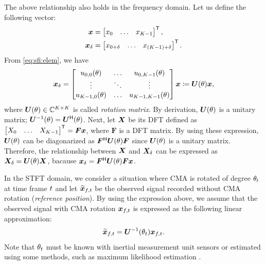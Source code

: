 \documentclass[sip,biber]{now-journal}
\begin{document}
The above relationship also holds in the frequency domain.
Let us define the following vector:
\begin{align}
  \bm{x} &= \begin{bmatrix} x _{0} & \dots & x _{K - 1} \end{bmatrix} ^{\mathsf{T}}, \\
  \bm{x} _{\delta} &= \begin{bmatrix} x _{0+\delta} & \dots & x _{(K - 1)+\delta} \end{bmatrix} ^{\mathsf{T}}.
\end{align}
From \eqref{eq:sfi:elem}, we have
\begin{equation}
  \bm{x} _{\delta}
  =
  \begin{bmatrix}
    u _{0, 0}(\theta) & \dots & u _{0, K - 1}(\theta) \\
    \vdots & \ddots & \vdots \\
    u _{K - 1, 0}(\theta) & \dots & u _{K - 1, K - 1}(\theta)
  \end{bmatrix}
  \bm{x}
  \coloneqq
  \bm{U} (\theta) \bm{x},
  \label{eq:rotmat}
\end{equation}
where $\bm{U} (\theta) \in \mathbb{C} ^{K\times K}$ is called \emph{rotation matrix}.
By derivation, $\bm{U} (\theta)$ is a unitary matrix; $\bm{U} ^{-1} (\theta) = \bm{U} ^{\mathsf{H}} (\theta)$.
Next, let $\bm{X}$ be its DFT defined as $\begin{bmatrix} X _{0} & \dots & X _{K - 1}\end{bmatrix} ^{\mathsf{T}} = \bm{F} \bm{x}$, where $\bm{F}$ is a DFT matrix.
By using these expression, $\bm{U} (\theta)$ can be diagonarized as $\bm{F}^{\mathsf{H}} \bm{U} (\theta) \bm{F}$ since $\bm{U} (\theta)$ is a unitary matrix.
Therefore, the relationship between $\bm{X}$ and $\bm{X} _{\delta}$ can be expressed as $\bm{X} _{\delta} = \bm{U} (\theta) \bm{X}$,
bacause $\bm{x} _{\delta} = \bm{F}^{\mathsf{H}} \bm{U} (\theta) \bm{F} \bm{x}$.

In the STFT domain, we consider a situation where CMA is rotated of degree $\theta _{t}$ at time frame $t$ and let $\refpos{\Obs} _{\ft}$ be the observed signal recorded without CMA rotation (\emph{reference position}).
By using the expression above, we assume that the observed signal with CMA rotation $\Obs _{\ft}$ is expressed as the following linear approximation:
\begin{equation}
  \refpos{\Obs} _{\ft} = \rotMat ^{-1} (\rotSpat _{\tframe}) \Obs _{\ft}.
\end{equation}
Note that $\theta _{t}$ must be known with inertial measurement unit sensors or estimated using some methods, such as maximum likelihood estimation \cite{Lian:2021:APSIPA}.
\end{document}
